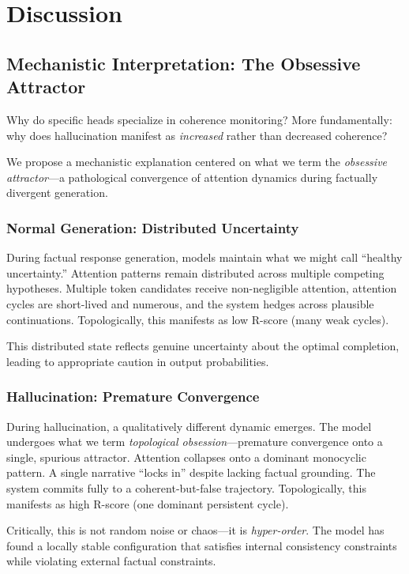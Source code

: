 \documentclass[11pt,twocolumn]{article}
\begin{document}
\section{Discussion}

\subsection{Mechanistic Interpretation: The Obsessive Attractor}

Why do specific heads specialize in coherence monitoring? More fundamentally: why does hallucination manifest as \textit{increased} rather than decreased coherence?

We propose a mechanistic explanation centered on what we term the \textit{obsessive attractor}---a pathological convergence of attention dynamics during factually divergent generation.

\subsubsection{Normal Generation: Distributed Uncertainty}

During factual response generation, models maintain what we might call ``healthy uncertainty.'' Attention patterns remain distributed across multiple competing hypotheses. Multiple token candidates receive non-negligible attention, attention cycles are short-lived and numerous, and the system hedges across plausible continuations. Topologically, this manifests as low R-score (many weak cycles).

This distributed state reflects genuine uncertainty about the optimal completion, leading to appropriate caution in output probabilities.

\subsubsection{Hallucination: Premature Convergence}

During hallucination, a qualitatively different dynamic emerges. The model undergoes what we term \textit{topological obsession}---premature convergence onto a single, spurious attractor. Attention collapses onto a dominant monocyclic pattern. A single narrative ``locks in'' despite lacking factual grounding. The system commits fully to a coherent-but-false trajectory. Topologically, this manifests as high R-score (one dominant persistent cycle).

Critically, this is not random noise or chaos---it is \textit{hyper-order}. The model has found a locally stable configuration that satisfies internal consistency constraints while violating external factual constraints.
\end{document}
